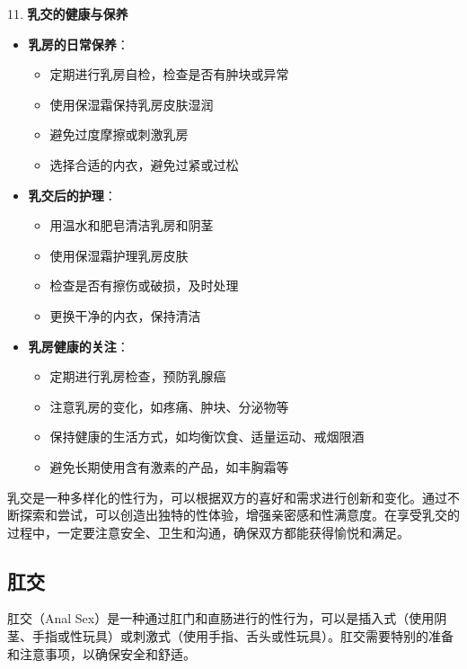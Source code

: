 \documentclass[12pt,UTF8]{ctexbook}
\begin{document}
11. \textbf{乳交的健康与保养}
\begin{itemize}
	\item \textbf{乳房的日常保养}：
	\begin{itemize}
		\item 定期进行乳房自检，检查是否有肿块或异常
		\item 使用保湿霜保持乳房皮肤湿润
		\item 避免过度摩擦或刺激乳房
		\item 选择合适的内衣，避免过紧或过松
	\end{itemize}
	\item \textbf{乳交后的护理}：
	\begin{itemize}
		\item 用温水和肥皂清洁乳房和阴茎
		\item 使用保湿霜护理乳房皮肤
		\item 检查是否有擦伤或破损，及时处理
		\item 更换干净的内衣，保持清洁
	\end{itemize}
	\item \textbf{乳房健康的关注}：
	\begin{itemize}
		\item 定期进行乳房检查，预防乳腺癌
		\item 注意乳房的变化，如疼痛、肿块、分泌物等
		\item 保持健康的生活方式，如均衡饮食、适量运动、戒烟限酒
		\item 避免长期使用含有激素的产品，如丰胸霜等
	\end{itemize}
\end{itemize}

乳交是一种多样化的性行为，可以根据双方的喜好和需求进行创新和变化。通过不断探索和尝试，可以创造出独特的性体验，增强亲密感和性满意度。在享受乳交的过程中，一定要注意安全、卫生和沟通，确保双方都能获得愉悦和满足。

\subsection{肛交}

肛交（Anal Sex）是一种通过肛门和直肠进行的性行为，可以是插入式（使用阴茎、手指或性玩具）或刺激式（使用手指、舌头或性玩具）。肛交需要特别的准备和注意事项，以确保安全和舒适。
\end{document}

